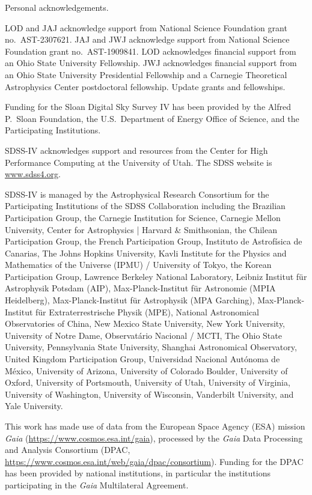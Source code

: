 \documentclass[twocolumn,twocolappendix,linenumbers]{aastex631}
\newcommand{\todo}[1]{{\color{red}#1}}
\begin{document}
\todo{Personal acknowledgements.}

LOD and JAJ acknowledge support from National Science Foundation grant no.\ AST-2307621. JAJ and JWJ acknowledge support from National Science Foundation grant no.\ AST-1909841.
LOD acknowledges financial support from an Ohio State University Fellowship.
JWJ acknowledges financial support from an Ohio State University Presidential Fellowship and a Carnegie Theoretical Astrophysics Center postdoctoral fellowship. \todo{Update grants and fellowships.}

Funding for the Sloan Digital Sky 
Survey IV has been provided by the 
Alfred P.\ Sloan Foundation, the U.S.\ 
Department of Energy Office of 
Science, and the Participating 
Institutions. 

SDSS-IV acknowledges support and 
resources from the Center for High 
Performance Computing  at the 
University of Utah. The SDSS 
website is \url{www.sdss4.org}.

SDSS-IV is managed by the 
Astrophysical Research Consortium 
for the Participating Institutions 
of the SDSS Collaboration including 
the Brazilian Participation Group, 
the Carnegie Institution for Science, 
Carnegie Mellon University, Center for 
Astrophysics | Harvard \& 
Smithsonian, the Chilean Participation 
Group, the French Participation Group, 
Instituto de Astrof\'isica de 
Canarias, The Johns Hopkins 
University, Kavli Institute for the 
Physics and Mathematics of the 
Universe (IPMU) / University of 
Tokyo, the Korean Participation Group, 
Lawrence Berkeley National Laboratory, 
Leibniz Institut f\"ur Astrophysik 
Potsdam (AIP),  Max-Planck-Institut 
f\"ur Astronomie (MPIA Heidelberg), 
Max-Planck-Institut f\"ur 
Astrophysik (MPA Garching), 
Max-Planck-Institut f\"ur 
Extraterrestrische Physik (MPE), 
National Astronomical Observatories of 
China, New Mexico State University, 
New York University, University of 
Notre Dame, Observat\'ario 
Nacional / MCTI, The Ohio State 
University, Pennsylvania State 
University, Shanghai 
Astronomical Observatory, United 
Kingdom Participation Group, 
Universidad Nacional Aut\'onoma 
de M\'exico, University of Arizona, 
University of Colorado Boulder, 
University of Oxford, University of 
Portsmouth, University of Utah, 
University of Virginia, University 
of Washington, University of 
Wisconsin, Vanderbilt University, 
and Yale University.

This work has made use of data from the European Space Agency (ESA) mission
{\it Gaia} (\url{https://www.cosmos.esa.int/gaia}), processed by the {\it Gaia}
Data Processing and Analysis Consortium (DPAC,
\url{https://www.cosmos.esa.int/web/gaia/dpac/consortium}). Funding for the DPAC
has been provided by national institutions, in particular the institutions
participating in the {\it Gaia} Multilateral Agreement.
\end{document}
